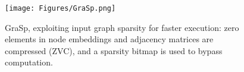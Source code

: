 
\begin{figure}[t!]
\begin{center}
\texttt{[image: Figures/GraSp.png]}%
\end{center}
\caption{GraSp, exploiting input graph sparsity for faster execution: zero elements in node embeddings and adjacency matrices are compressed (ZVC), and a sparsity bitmap is used to bypass computation.}\label{fig:GraSp}
\end{figure}

